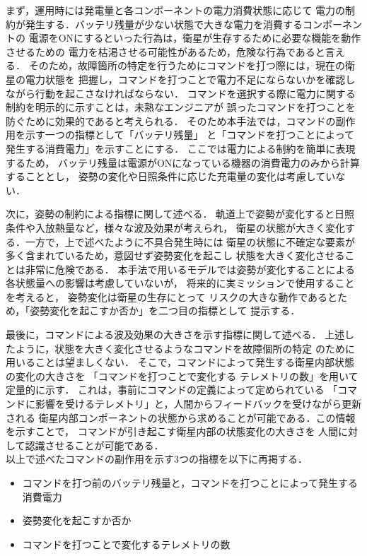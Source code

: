 \documentclass[11pt]{jsreport}
\begin{document}
まず，運用時には発電量と各コンポーネントの電力消費状態に応じて
電力の制約が発生する．バッテリ残量が少ない状態で大きな電力を消費するコンポーネントの
電源をONにするといった行為は，衛星が生存するために必要な機能を動作させるための
電力を枯渇させる可能性があるため，危険な行為であると言える．
そのため，故障箇所の特定を行うためにコマンドを打つ際には，現在の衛星の電力状態を
把握し，コマンドを打つことで電力不足にならないかを確認しながら行動を起こさなければならない．
コマンドを選択する際に電力に関する制約を明示的に示すことは，未熟なエンジニアが
誤ったコマンドを打つことを防ぐために効果的であると考えられる．
そのため本手法では，コマンドの副作用を示す一つの指標として「バッテリ残量」
と「コマンドを打つことによって発生する消費電力」を示すことにする．
ここでは電力による制約を簡単に表現するため，
バッテリ残量は電源がONになっている機器の消費電力のみから計算することとし，
姿勢の変化や日照条件に応じた充電量の変化は考慮していない．

次に，姿勢の制約による指標に関して述べる．
軌道上で姿勢が変化すると日照条件や入放熱量など，様々な波及効果が考えられ，
衛星の状態が大きく変化する．一方で，上で述べたように不具合発生時には
衛星の状態に不確定な要素が多く含まれているため，意図せず姿勢変化を起こし
状態を大きく変化させることは非常に危険である．
本手法で用いるモデルでは姿勢が変化することによる各状態量への影響は考慮していないが，
将来的に実ミッションで使用することを考えると，%
姿勢変化は衛星の生存にとって
リスクの大きな動作であるとため，「姿勢変化を起こすか否か」を二つ目の指標として
提示する．

最後に，コマンドによる波及効果の大きさを示す指標に関して述べる．
上述したように，状態を大きく変化させるようなコマンドを故障個所の特定
のために用いることは望ましくない．
そこで，コマンドによって発生する衛星内部状態の変化の大きさを
「コマンドを打つことで変化する
テレメトリの数」を用いて定量的に示す．
これは，事前にコマンドの定義によって定められている
「コマンドに影響を受けるテレメトリ」と，人間からフィードバックを受けながら更新される
衛星内部コンポーネントの状態から求めることが可能である．この情報を示すことで，
コマンドが引き起こす衛星内部の状態変化の大きさを
人間に対して認識させることが可能である．\\
以上で述べたコマンドの副作用を示す3つの指標を以下に再掲する．
\begin{itemize}
   \item コマンドを打つ前のバッテリ残量と，コマンドを打つことによって発生する消費電力
   \item 姿勢変化を起こすか否か
   \item コマンドを打つことで変化するテレメトリの数
\end{itemize}
\end{document}
